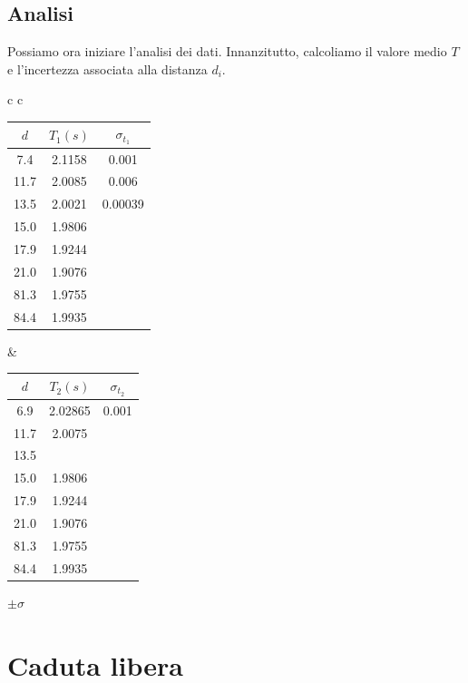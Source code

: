 \subsection{Analisi}
Possiamo ora iniziare l'analisi dei dati. Innanzitutto, calcoliamo il valore medio $T$ e l'incertezza associata alla distanza $d_i$.
\begin{center}
\begin{tabular}{c   c}
\begin{tabular}{c|c|c}
$d$ & $T_1(s)$ & $\sigma_{t_1}$ \\
\midrule
7.4 & 2.1158 & 0.001\\
11.7 & 2.0085 & 0.006\\
13.5 & 2.0021 & 0.00039\\
15.0 &  1.9806 & \\
17.9 & 1.9244 &\\
21.0 & 1.9076 &\\
81.3 & 1.9755&\\
84.4 & 1.9935&\\
\end{tabular}
&
\begin{tabular}{c|c|c}
$d$ & $T_2(s)$ & $\sigma_{t_2}$ \\
\midrule
6.9 & 2.02865 & 0.001\\
11.7 & 2.0075 &\\
13.5 & &\\
15.0 &  1.9806 &\\
17.9 & 1.9244 &\\
21.0 & 1.9076 &\\
81.3 & 1.9755&\\
84.4 & 1.9935&\\
\end{tabular}
\end{tabular}
\end{center}


$\pm\sigma$

\section{Caduta libera}


